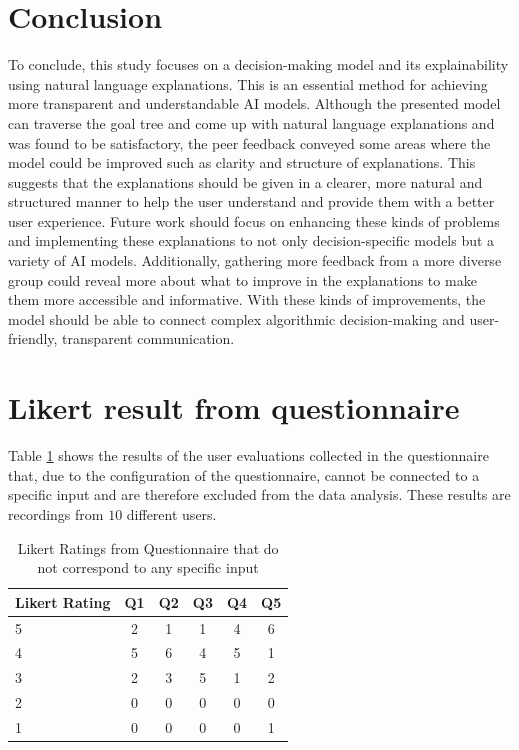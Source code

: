 \documentclass[sigconf,nonacm]{acmart}
\begin{document}
\section{Conclusion} \label{sec:conclusion}

To conclude, this study focuses on a decision-making model and its explainability using natural language explanations. This is an essential method for achieving more transparent and understandable AI models. Although the presented model can traverse the goal tree and come up with natural language explanations and was found to be satisfactory, the peer feedback conveyed some areas where the model could be improved such as clarity and structure of explanations. This suggests that the explanations should be given in a clearer, more natural and structured manner to help the user understand and provide them with a better user experience. Future work should focus on enhancing these kinds of problems and implementing these explanations to not only decision-specific models but a variety of AI models. Additionally, gathering more feedback from a more diverse group could reveal more about what to improve in the explanations to make them more accessible and informative. With these kinds of improvements, the model should be able to connect complex algorithmic decision-making and user-friendly, transparent communication.

\newpage
\appendix
\section{Likert result from questionnaire} \label{app:likert}

Table \ref{tab:likert_unused} shows the results of the user evaluations collected in the questionnaire that, due to the configuration of the questionnaire, cannot be connected to a specific input and are therefore excluded from the data analysis. These results are recordings from $10$ different users.


\begin{table}[h]
    \centering
    \begin{tabular}{lccccc}
        \toprule
        Likert Rating & Q1 & Q2 & Q3 & Q4 & Q5 \\
        \midrule
        5 & 2 & 1 & 1 & 4 &  6 \\
        4 & 5 & 6 & 4 & 5 & 1 \\
        3 & 2 & 3 & 5 & 1 & 2 \\
        2 & 0 & 0 & 0 & 0 & 0 \\
        1 & 0 & 0 & 0 & 0 & 1 \\
        \bottomrule
    \end{tabular}
    \caption{Likert Ratings from Questionnaire that do not correspond to any specific input}
    \label{tab:likert_unused}
\end{table}
\end{document}
